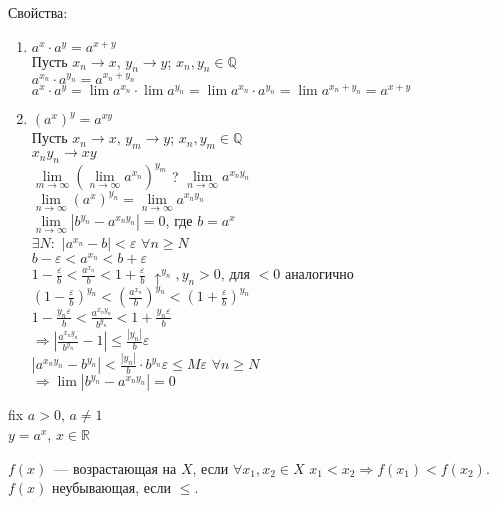 \documentclass[12pt]{article}
\begin{document}
	Свойства:
	\begin{enumerate}
		\item $a^x \cdot a^y = a^{x + y}$ \\
		Пусть $x_n \rightarrow x$, $y_n \rightarrow y$; $x_n, y_n \in \mathbb{Q}$ \\
		$a^{x_n} \cdot a^{y_n} = a^{x_n + y_n}$ \\
		$a^x \cdot a^y = \lim a^{x_n} \cdot \lim a^{y_n} = \lim a^{x_n} \cdot a^{y_n} = \lim a^{x_n + y_n} = a^{x + y}$
		\item $(a^x)^y = a^{xy}$ \\
		Пусть $x_n \rightarrow x$, $y_m \rightarrow y$; $x_n, y_m \in \mathbb{Q}$ \\
		$x_ny_n \rightarrow xy$ \\
		$\lim \limits_{m \rightarrow \infty} (\lim \limits_{n \rightarrow \infty} a^{x_n})^{y_m}$ ? $\lim \limits_{n \rightarrow \infty} a^{x_ny_n}$ \\
		$\lim \limits_{n \rightarrow \infty} (a^x)^{y_n} = \lim \limits_{n \rightarrow \infty} a^{x_ny_n}$ \\
		$\lim \limits_{n \rightarrow \infty} |b^{y_n} - a^{x_ny_n}| = 0$, где $b = a^x$ \\
		$\exists N:$ $|a^{x_n} - b| < \varepsilon$ $\forall n \geqslant N$ \\
		$b - \varepsilon < a^{x_n} < b + \varepsilon$ \\
		$1 - \frac{\varepsilon}{b} < \frac{a^{x_n}}{b} < 1 + \frac{\varepsilon}{b}$ $\uparrow ^{y_n}, y_n > 0$, для $< 0$ аналогично \\
		$(1 - \frac{\varepsilon}{b})^{y_n} < (\frac{a^{x_n}}{b})^{y_n} < (1 + \frac{\varepsilon}{b})^{y_n}$ \\
		$1 - \frac{y_n \varepsilon}{b} < \frac{a^{x_ny_n}}{b^{y_n}} < 1 + \frac{y_n \varepsilon}{b}$ \\
		$\Rightarrow |\frac{a^{x_ny_n}}{b^{y_n}} - 1| \leqslant \frac{|y_n|}{b} \varepsilon$ \\
		$|a^{x_ny_n} - b^{y_n}| < \frac{|y_n|}{b} \cdot b^{y_n} \varepsilon \leqslant M\varepsilon$ $\forall n \geqslant N$ \\
		$\Rightarrow \lim |b^{y_n} - a^{x_ny_n}| = 0$
	\end{enumerate}
	fix $a > 0$, $a \not= 1$ \\
	$y = a^x$, $x \in \mathbb{R}$
	\begin{definition}
		$f(x)$~--- возрастающая на $X$, если $\forall x_1, x_2 \in X$ $x_1 < x_2 \Rightarrow f(x_1) < f(x_2)$. $f(x)$ неубывающая, если $\leqslant$.
	\end{definition}
\end{document}
